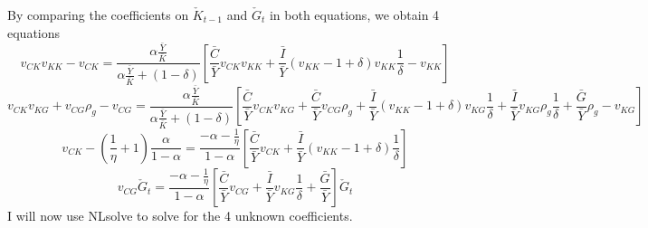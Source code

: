 \documentclass[11pt]{amsart}
\begin{document}
By comparing the coefficients on $\check{K}_{t-1}$ and $\check{G}_t$ in both equations, we obtain 4 equations
\begin{dmath*}
	v_{CK} v_{KK} - v_{CK} = \frac{\alpha \frac{\bar{Y}}{\bar{K}}}{\alpha \frac{\bar{Y}}{\bar{K}} + (1-\delta)} \left[ \frac{\bar{C}}{\bar{Y}} v_{CK} v_{KK} + \frac{\bar{I}}{\bar{Y}} (v_{KK} - 1 + \delta) v_{KK} \frac{1}{\delta} - v_{KK} \right]
\end{dmath*}
\begin{dmath*}
	v_{CK} v_{KG} + v_{CG}\rho_g - v_{CG} = \frac{\alpha \frac{\bar{Y}}{\bar{K}}}{\alpha \frac{\bar{Y}}{\bar{K}} + (1-\delta)} \left[ \frac{\bar{C}}{\bar{Y}} v_{CK} v_{KG} + \frac{\bar{C}}{\bar{Y}} v_{CG} \rho_g + \frac{\bar{I}}{\bar{Y}} (v_{KK} - 1 + \delta) v_{KG} \frac{1}{\delta} + \frac{\bar{I}}{\bar{Y}} v_{KG} \rho_g \frac{1}{\delta} + \frac{\bar{G}}{\bar{Y}} \rho_g - v_{KG} \right]
\end{dmath*}
\begin{dmath*}
	v_{CK} - \left( \frac{1}{\eta} + 1 \right) \frac{\alpha}{1-\alpha} = \frac{-\alpha - \frac{1}{\eta}}{1-\alpha} \left[ \frac{\bar{C}}{\bar{Y}} v_{CK} + \frac{\bar{I}}{\bar{Y}} (v_{KK} - 1 + \delta) \frac{1}{\delta} \right]
\end{dmath*}
\begin{dmath*}
	v_{CG} \check{G}_t = \frac{-\alpha - \frac{1}{\eta}}{1-\alpha} \left[ \frac{\bar{C}}{\bar{Y}} v_{CG} + \frac{\bar{I}}{\bar{Y}} v_{KG} \frac{1}{\delta} + \frac{\bar{G}}{\bar{Y}} \right] \check{G}_{t}
\end{dmath*}
I will now use NLsolve to solve for the 4 unknown coefficients.
\end{document}
